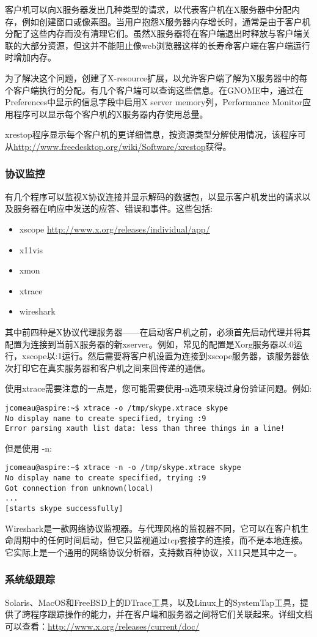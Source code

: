 客户机可以向X服务器发出几种类型的请求，以代表客户机在X服务器中分配内存，例如创建窗口或像素图。当用户抱怨X服务器内存增长时，通常是由于客户机分配了这些内存而没有清理它们。虽然X服务器将在客户端退出时释放与客户端关联的大部分资源，但这并不能阻止像web浏览器这样的长寿命客户端在客户端运行时增加内存。

为了解决这个问题，创建了X-resource扩展，以允许客户端了解为X服务器中的每个客户端执行的分配。有几个客户端可以查询这些信息。在GNOME中，通过在Preferences中显示的信息字段中启用X server memory列，Performance Monitor应用程序可以显示每个客户机的X服务器内存使用总量。

xrestop程序显示每个客户机的更详细信息，按资源类型分解使用情况，该程序可从\url{http://www.freedesktop.org/wiki/Software/xrestop}获得。

\subsubsection{协议监控}

有几个程序可以监视X协议连接并显示解码的数据包，以显示客户机发出的请求以及服务器在响应中发送的应答、错误和事件。这些包括:
\begin{itemize}
	\item xscope \url{http://www.x.org/releases/individual/app/}
	\item x11vis
	\item xmon
	\item xtrace
	\item wireshark
\end{itemize}

\noindent 其中前四种是X协议代理服务器——在启动客户机之前，必须首先启动代理并将其配置为连接到当前X服务器的新xserver。例如，常见的配置是Xorg服务器以:0运行，xscope以:1运行。然后需要将客户机设置为连接到xscope服务器，该服务器依次打印它在真实服务器和客户机之间来回传递的通信。

使用xtrace需要注意的一点是，您可能需要使用-n选项来绕过身份验证问题。例如:

\begin{lstlisting}
jcomeau@aspire:~$ xtrace -o /tmp/skype.xtrace skype
No display name to create specified, trying :9
Error parsing xauth list data: less than three things in a line!
\end{lstlisting}

但是使用 -n:

\begin{lstlisting}
jcomeau@aspire:~$ xtrace -n -o /tmp/skype.xtrace skype
No display name to create specified, trying :9
Got connection from unknown(local)
...
[starts skype successfully]
\end{lstlisting}

Wireshark是一款网络协议监视器。与代理风格的监视器不同，它可以在客户机生命周期中的任何时间启动，但它只监视通过tcp套接字的连接，而不是本地连接。它实际上是一个通用的网络协议分析器，支持数百种协议，X11只是其中之一。

\subsubsection{系统级跟踪}

Solaris、MacOS和FreeBSD上的DTrace工具，以及Linux上的SystemTap工具，提供了跨程序跟踪操作的能力，并在客户端和服务器之间将它们关联起来。详细文档可以查看：\url{http://www.x.org/releases/current/doc/}
